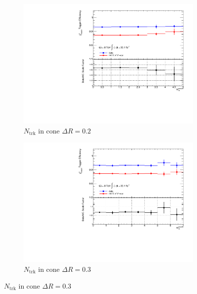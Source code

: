 \begin{figure}[htbp]
  \centering
    \begin{subfigure}[b]{0.54\textwidth}
      \includegraphics[width=\textwidth]{PartCalibration2012/Plots/SFPlots/nucone20_smt.pdf}  
      \caption{$N_{\textrm{trk}}$ in cone $\Delta R=0.2$}\label{fig:CalibrationIsoNucone20}
    \end{subfigure}
    
    \begin{subfigure}[b]{0.54\textwidth}
      \includegraphics[width=\textwidth]{PartCalibration2012/Plots/SFPlots/nucone30_smt.pdf}
      \caption{$N_{\textrm{trk}}$ in cone $\Delta R=0.3$}\label{fig:CalibrationIsoNucone30}
    \end{subfigure}
    

\end{figure}
